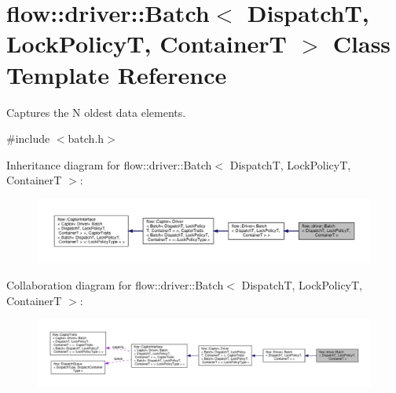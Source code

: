 \hypertarget{classflow_1_1driver_1_1_batch}{}\section{flow\+:\+:driver\+:\+:Batch$<$ DispatchT, Lock\+PolicyT, ContainerT $>$ Class Template Reference}
\label{classflow_1_1driver_1_1_batch}


Captures the N oldest data elements.  




{\ttfamily \#include $<$batch.\+h$>$}



Inheritance diagram for flow\+:\+:driver\+:\+:Batch$<$ DispatchT, Lock\+PolicyT, ContainerT $>$\+:\nopagebreak
\begin{figure}[H]
\begin{center}
\leavevmode
\includegraphics[width=350pt]{classflow_1_1driver_1_1_batch__inherit__graph}
\end{center}
\end{figure}


Collaboration diagram for flow\+:\+:driver\+:\+:Batch$<$ DispatchT, Lock\+PolicyT, ContainerT $>$\+:\nopagebreak
\begin{figure}[H]
\begin{center}
\leavevmode
\includegraphics[width=350pt]{classflow_1_1driver_1_1_batch__coll__graph}
\end{center}
\end{figure}
